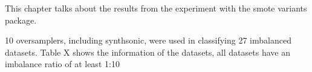 
This chapter talks about the results from the experiment with the smote variants package.

10 oversamplers, including synthsonic, were used in classifying 27 imbalanced datasets. Table X shows the information of the datasets, all datasets have an imbalance ratio of at least 1:10

